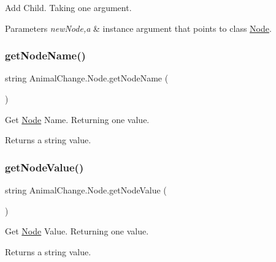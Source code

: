 Add Child. Taking one argument. 


\begin{DoxyParams}{Parameters}
{\em new\+Node,a} & instance argument that points to class \mbox{\hyperlink{class_animal_change_1_1_node}{Node}}. \\
\hline
\end{DoxyParams}
\mbox{\label{class_animal_change_1_1_node_a39ca6b489b5af18b35f6bdd28c2aef6d}} 
\subsubsection{\texorpdfstring{getNodeName()}{getNodeName()}}
{\footnotesize\ttfamily string Animal\+Change.\+Node.\+get\+Node\+Name (\begin{DoxyParamCaption}{ }\end{DoxyParamCaption})\hspace{0.3cm}{\ttfamily [inline]}}



Get \mbox{\hyperlink{class_animal_change_1_1_node}{Node}} Name. Returning one value. 

\begin{DoxyReturn}{Returns}
a string value. 
\end{DoxyReturn}
\mbox{\label{class_animal_change_1_1_node_a3d72b6b2f442dcb1254eacdbb45c5d5d}} 
\subsubsection{\texorpdfstring{getNodeValue()}{getNodeValue()}}
{\footnotesize\ttfamily string Animal\+Change.\+Node.\+get\+Node\+Value (\begin{DoxyParamCaption}{ }\end{DoxyParamCaption})\hspace{0.3cm}{\ttfamily [inline]}}



Get \mbox{\hyperlink{class_animal_change_1_1_node}{Node}} Value. Returning one value. 

\begin{DoxyReturn}{Returns}
a string value. 
\end{DoxyReturn}
\mbox{\label{class_animal_change_1_1_node_aa796b68392c237af7808a15c01c384c0}} 
